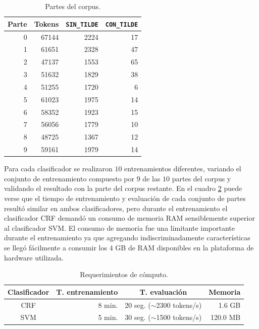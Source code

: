 \documentclass[runningheads,a4paper]{llncs}
\begin{document}
\begin{table}[ht]
 	\renewcommand{\arraystretch}{1.3}
	\renewcommand{\tabcolsep}{3pt}
	\caption{Partes del corpus.}
	\label{table:partes-corpus}
	\centering
	\begin{tabular}{r r r r}
		\hline\hline
		\multicolumn{1}{c}{\textbf{Parte}} 
		& \multicolumn{1}{c}{\textbf{Tokens}} 
		& \multicolumn{1}{c}{\textbf{\texttt{SIN\_TILDE}}} 
		& \multicolumn{1}{c}{\textbf{\texttt{CON\_TILDE}}} \\
		\hline
		0 & 67144 & 2224 & 17 \\
		1 & 61651 & 2328 & 47 \\
		2 & 47137 & 1553 & 65 \\
		3 & 51632 & 1829 & 38 \\
		4 & 51255 & 1720 & 6 \\
		5 & 61023 & 1975 & 14 \\
		6 & 58352 & 1923 & 15 \\
		7 & 56056 & 1779 & 10 \\
		8 & 48725 & 1367 & 12 \\
		9 & 59161 & 1979 & 14 \\
		\hline
	\end{tabular}
\end{table}

Para cada clasificador se realizaron $10$ entrenamientos diferentes, variando el conjunto de entrenamiento compuesto por $9$ de las $10$ partes del corpus y validando el resultado con la parte del corpus restante. En el cuadro \ref{table:tiempo-entrenamiento} puede verse que el tiempo de entrenamiento y evaluación de cada conjunto de partes resultó similar en ambos clasificadores, pero durante el entrenamiento el clasificador CRF demandó un consumo de memoria RAM sensiblemente superior al clasificador SVM. El consumo de memoria fue una limitante importante durante el entrenamiento ya que agregando indiscriminadamente características se lleg\'o fácilmente a consumir los 4 GB de RAM disponibles en la plataforma de hardware utilizada.

\begin{table}[ht]
 	\renewcommand{\arraystretch}{1.3}
	\renewcommand{\tabcolsep}{3pt}
	\caption{Requerimientos de c\'omputo.}
	\label{table:tiempo-entrenamiento}
	\centering
	\begin{tabular}{c r r r}
		\hline\hline
		\multicolumn{1}{c}{\textbf{Clasificador}} 
		& \multicolumn{1}{c}{\textbf{T. entrenamiento}} 
		& \multicolumn{1}{c}{\textbf{T. evaluaci\'on}} 
		& \multicolumn{1}{c}{\textbf{Memoria}} \\
		\hline
		CRF & 8 min. & 20 seg. ($\sim$2300 tokens/s) & 1.6 GB \\
		SVM & 5 min. & 30 seg. ($\sim$1500 tokens/s) & 120.0 MB \\
		\hline
	\end{tabular}
\end{table}
\end{document}

